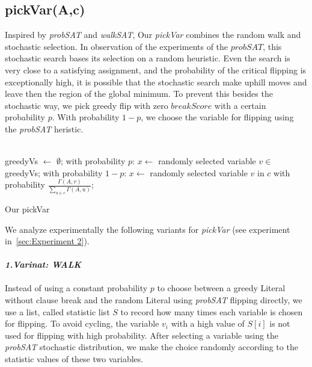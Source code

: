 \documentclass[12pt,a4paper,twoside]{scrartcl}
\numberwithin{equation}{section}
\begin{document}
\subsection{pickVar(A,c)}
Inspired by \emph{probSAT} and \emph{walkSAT}, Our \emph{pickVar} combines the random walk and stochastic selection. 
In observation of the experiments of the $probSAT$, this stochastic search bases its selection on a random heuristic.  Even the search is very close to a satisfying assignment, and the probability of the critical flipping is exceptionally high, it is possible that the stochastic search make uphill moves and leave then the region of the global minimum. To prevent this besides the stochastic way,  we pick greedy flip with zero $breakScore$ with a certain probability $p$. With probability $1-p$, we choose the variable for flipping using the \emph{probSAT} heristic.\\
\\
\begin{algorithm}[H]
 greedyVs $\leftarrow$ $\emptyset$;\;
  with probability $p$: $x \leftarrow$ randomly selected variable $v \in$ greedyVs;  \;
  with probability $1-p$:   $x \leftarrow$ randomly selected  variable $v$ in $c$ with probability $\frac{\Gamma(A,v)}{\sum_{u \in c}\Gamma(A,u)}$;  
\caption{Our pickVar}
\end{algorithm}  
We analyze experimentally the following variants for  \emph{pickVar} (see experiment in~\ref{sec:Experiment 2}).\\
\\ 
 \emph{\textbf{1.Varinat: WALK}}\\
\\
Instead of using a constant probability $p$ to choose between a greedy Literal without clause break and the random Literal using \emph{probSAT} flipping directly, we use a list, called statistic list $S$ to record how many times each variable is chosen for flipping.  To avoid cycling, the variable $v_i$ with a high value of $S[i]$ is not used for flipping with high probability. After selecting a variable using the \emph{probSAT} stochastic distribution, we make the choice randomly according to the statistic values of these two variables.\\
 \\
\end{document}

